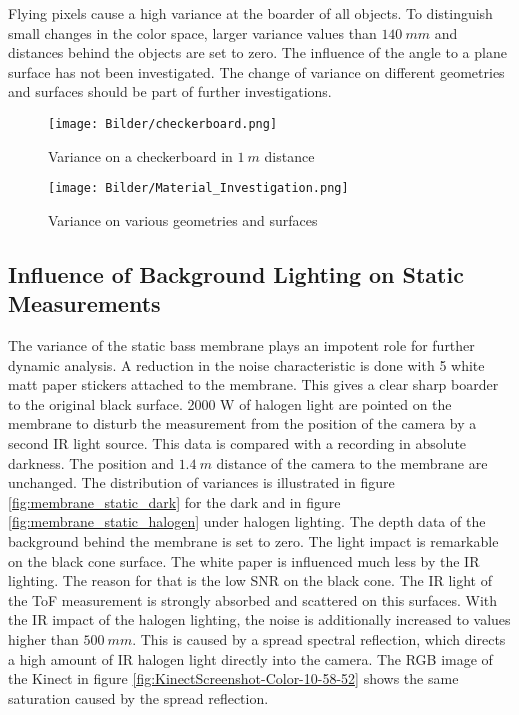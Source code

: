 Flying pixels cause a high variance at the boarder of all objects. To distinguish small changes in the color space, larger variance values than $140~mm$ and distances behind the objects are set to zero. The influence of the angle to a plane surface has not been investigated. The change of variance on different geometries and surfaces should be part of further investigations. 

\begin{figure}[!h]
	\centering
	\texttt{[image: Bilder/checkerboard.png]}
	\caption{Variance on a checkerboard in $1~m$ distance}
	\label{fig:checkerboard}
\end{figure}

\begin{figure}[!h]
	\centering
	\texttt{[image: Bilder/Material\_Investigation.png]}
	\caption{Variance on various geometries and surfaces}
	\label{fig:Material_Investigation}
\end{figure}

\subsection{Influence of Background Lighting on Static Measurements} \label{chap:static_Lighting}
The variance of the static bass membrane plays an impotent role for further dynamic analysis. A reduction in the noise characteristic is done with 5 white matt paper stickers attached to the membrane. This gives a clear sharp boarder to the original black surface. 2000 W of halogen light are pointed on the membrane to disturb the measurement from the position of the camera by a second IR light source. This data is compared with a recording in absolute darkness. The position and $1.4~m$ distance of the camera to the membrane are unchanged. The distribution of variances is illustrated in figure \ref{fig:membrane_static_dark} for the dark and in figure \ref{fig:membrane_static_halogen} under halogen lighting. The depth data of the background behind the membrane is set to zero. The light impact is remarkable on the black cone surface. The white paper is influenced much less by the IR lighting. The reason for that is the low SNR on the black cone. The IR light of the ToF measurement is strongly absorbed and scattered on this surfaces. With the IR impact of the halogen lighting, the noise is additionally increased to values higher than $500~mm$. This is caused by a spread spectral reflection, which directs a high amount of IR halogen light directly into the camera. The RGB image of the Kinect in figure \ref{fig:KinectScreenshot-Color-10-58-52} shows the same saturation caused by the spread reflection.

